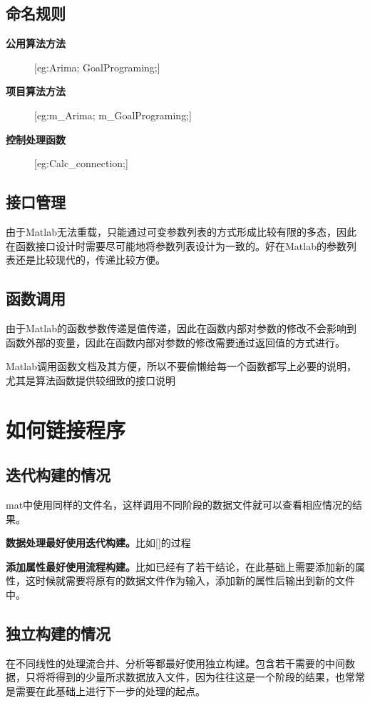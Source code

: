 \documentclass[12pt]{article}
\newcommand{\red}[1]{\textcolor[rgb]{1.00,0.00,0.00}{#1}}
\begin{document}
        \subsection{命名规则}
        \begin{description}
            \item[\textbf{公用算法方法}]
                   [eg:Arima;  GoalPrograming;] 
            \item[\textbf{项目算法方法}]
                   [eg:m\_Arima;  m\_GoalPrograming;]
            \item[\textbf{控制处理函数}]   
                   [eg:Calc\_connection;] 
        \end{description}

        \subsection{接口管理}
        由于Matlab无法重载，只能通过可变参数列表的方式形成比较有限的多态，因此在函数接口设计时需要尽可能地将参数列表设计为一致的。好在Matlab的参数列表还是比较现代的，传递比较方便。

        \subsection{函数调用}
        由于Matlab的函数参数传递是值传递，因此在函数内部对参数的修改不会影响到函数外部的变量，因此在函数内部对参数的修改需要通过返回值的方式进行。

        Matlab调用函数文档及其方便，所以\red{不要偷懒给每一个函数都写上必要的说明，尤其是算法函数提供较细致的接口说明}

    \section{如何链接程序}
        \subsection{迭代构建的情况}
            mat中使用同样的文件名，这样调用不同阶段的数据文件就可以查看相应情况的结果。

            \textbf{数据处理最好使用迭代构建。}比如[\rightarrow {}\rightarrow {}\rightarrow {}]的过程

            \textbf{添加属性最好使用流程构建。}比如已经有了若干结论，在此基础上需要添加新的属性，这时候就需要将原有的数据文件作为输入，添加新的属性后输出到新的文件中。
        
        \subsection{独立构建的情况}
            在不同线性的处理流合并、分析等都最好使用独立构建。包含若干需要的中间数据，只将将得到的少量所求数据放入文件，因为往往这是一个阶段的结果，也常常是需要在此基础上进行下一步的处理的起点。
\end{document}
